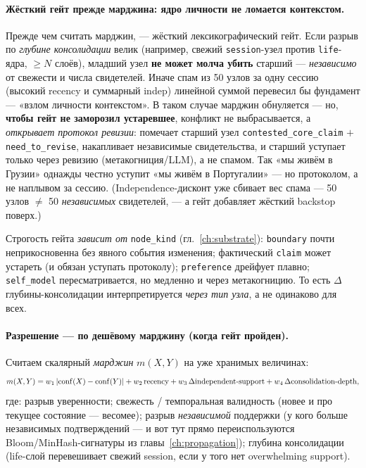 \paragraph{Жёсткий гейт прежде марджина: ядро личности не ломается контекстом.}
Прежде чем считать марджин, — жёсткий лексикографический гейт. Если разрыв по
\emph{глубине консолидации} велик (например, свежий \texttt{session}-узел против
\texttt{life}-ядра, $\ge N$ слоёв), младший узел \textbf{не может молча убить}
старший — \emph{независимо} от свежести и числа свидетелей. Иначе спам из 50 узлов за
одну сессию (высокий recency и суммарный indep) линейной суммой перевесил бы
фундамент — «взлом личности контекстом». В таком случае марджин обнуляется —
но, \textbf{чтобы гейт не заморозил устаревшее}, конфликт не выбрасывается, а
\emph{открывает протокол ревизии}: помечает старший узел \texttt{contested\_core\_claim}
$+$ \texttt{need\_to\_revise}, накапливает независимые свидетельства, и старший
уступает только через ревизию (метакогниция/LLM), а не спамом. Так «мы живём в
Грузии» однажды честно уступит «мы живём в Португалии» — но протоколом, а не наплывом
за сессию. (Independence-дисконт уже сбивает вес спама — 50 узлов $\ne$ 50
\emph{независимых} свидетелей, — а гейт добавляет жёсткий backstop поверх.)

Строгость гейта \emph{зависит от} \texttt{node\_kind} (гл.~\ref{ch:substrate}):
\texttt{boundary} почти неприкосновенна без явного события изменения; фактический
\texttt{claim} может устареть (и обязан уступать протоколу); \texttt{preference}
дрейфует плавно; \texttt{self\_model} пересматривается, но медленно и через
метакогницию. То есть $\Delta$глубины-консолидации интерпретируется \emph{через тип
узла}, а не одинаково для всех.

\paragraph{Разрешение — по дешёвому марджину (когда гейт пройден).} Считаем скалярный
\emph{марджин} $m(X,Y)$ на уже хранимых величинах:
\[
m(X,Y)=w_1\,|\mathrm{conf}(X)-\mathrm{conf}(Y)|
+w_2\,\text{recency}
+w_3\,\Delta\text{independent-support}
+w_4\,\Delta\text{consolidation-depth},
\]
где: разрыв уверенности; свежесть / темпоральная валидность (новее и про текущее
состояние — весомее); разрыв \emph{независимой} поддержки (у кого больше независимых
подтверждений — и вот тут прямо переиспользуются Bloom/MinHash-сигнатуры из
главы~\ref{ch:propagation}); глубина консолидации (life-слой перевешивает свежий
session, если у того нет overwhelming support).

